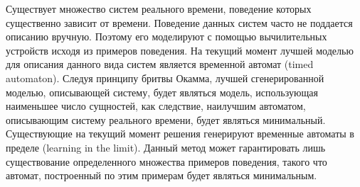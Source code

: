 \documentclass[times,specification,annotation]{itmo-student-thesis}
\begin{document}







\tableofcontents

\startprefacepage

Существует множество систем реального времени, поведение которых существенно зависит от времени. Поведение данных систем часто не поддается описанию вручную. Поэтому его
моделируют с помощью вычилительных устройств исходя из примеров поведения. На текущий момент лучшей моделью для описания данного вида систем является временной автомат (timed automaton).
Следуя принципу бритвы Окамма, лучшей сгенерированной моделью, описывающей систему, будет являться модель, использующая наименьшее число сущностей, как следствие,
наилучшим автоматом, описывающим систему реального времени, будет являться минимальный. Существующие на текущий момент решения генерируют временные
автоматы в пределе (learning in the limit). Данный метод может гарантировать лишь существование определенного множества примеров поведения, такого что автомат, построенный
по этим примерам будет являться минимальным.
\end{document}
